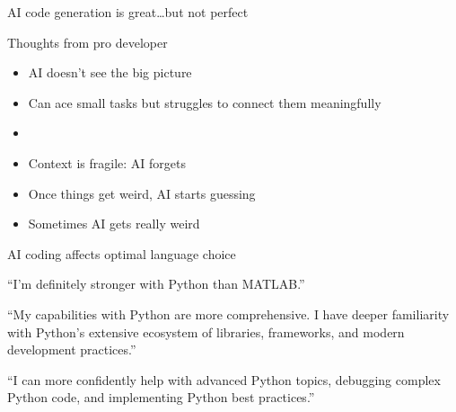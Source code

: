 \begin{frame}
    
    AI code generation is great\ldots but not perfect

\end{frame}


\begin{frame}

    Thoughts from pro developer 

    \begin{itemize}
        \item AI doesn't see the big picture
        \vspace{0.5em}
        \item Can ace small tasks but struggles to connect them meaningfully
        \vspace{0.5em}
        \item {}
        \vspace{0.5em}
        \item Context is fragile: AI forgets
        \vspace{0.5em}
        \item Once things get weird, AI starts guessing
        \vspace{0.5em}
        \item Sometimes AI gets really weird
    \end{itemize}

\end{frame}


\begin{frame}{AI coding affects optimal language choice}
    
    ``I'm definitely stronger with Python than MATLAB.''

    \vspace{0.5em}
    \vspace{0.5em}
    ``My capabilities with Python
    are more comprehensive. I have deeper familiarity with Python's extensive
    ecosystem of libraries, frameworks, and modern development practices.''


    \vspace{0.5em}
    \vspace{0.5em}
    ``I can
    more confidently help with advanced Python topics, debugging complex Python
    code, and implementing Python best practices.''

\end{frame}

